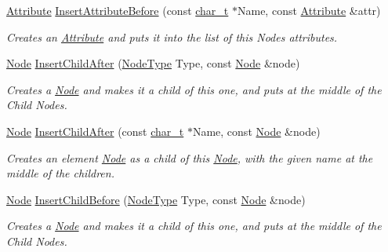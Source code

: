 \begin{DoxyCompactItemize}
\hyperlink{classMezzanine_1_1xml_1_1Attribute}{Attribute} \hyperlink{classMezzanine_1_1xml_1_1Node_a7614742c87922dd19f4a9ae2e393ebc3}{InsertAttributeBefore} (const \hyperlink{namespaceMezzanine_1_1xml_a29b8a47c179e9895c4e9e66c45d1dbbc}{char\_\-t} $\ast$Name, const \hyperlink{classMezzanine_1_1xml_1_1Attribute}{Attribute} \&attr)
\begin{DoxyCompactList}\small\item\em Creates an \hyperlink{classMezzanine_1_1xml_1_1Attribute}{Attribute} and puts it into the list of this Nodes attributes. \item\end{DoxyCompactList}\item 
\hyperlink{classMezzanine_1_1xml_1_1Node}{Node} \hyperlink{classMezzanine_1_1xml_1_1Node_a227829d650b184329245c5abdd0476df}{InsertChildAfter} (\hyperlink{namespaceMezzanine_1_1xml_a524d867e34ff408b8f45a51b7924cb80}{NodeType} Type, const \hyperlink{classMezzanine_1_1xml_1_1Node}{Node} \&node)
\begin{DoxyCompactList}\small\item\em Creates a \hyperlink{classMezzanine_1_1xml_1_1Node}{Node} and makes it a child of this one, and puts at the middle of the Child Nodes. \item\end{DoxyCompactList}\item 
\hyperlink{classMezzanine_1_1xml_1_1Node}{Node} \hyperlink{classMezzanine_1_1xml_1_1Node_a130d3fc4581355cbf7faf9ce56583113}{InsertChildAfter} (const \hyperlink{namespaceMezzanine_1_1xml_a29b8a47c179e9895c4e9e66c45d1dbbc}{char\_\-t} $\ast$Name, const \hyperlink{classMezzanine_1_1xml_1_1Node}{Node} \&node)
\begin{DoxyCompactList}\small\item\em Creates an element \hyperlink{classMezzanine_1_1xml_1_1Node}{Node} as a child of this \hyperlink{classMezzanine_1_1xml_1_1Node}{Node}, with the given name at the middle of the children. \item\end{DoxyCompactList}\item 
\hyperlink{classMezzanine_1_1xml_1_1Node}{Node} \hyperlink{classMezzanine_1_1xml_1_1Node_a0f877b7c3d64ede9a73662ed2fff0ef5}{InsertChildBefore} (\hyperlink{namespaceMezzanine_1_1xml_a524d867e34ff408b8f45a51b7924cb80}{NodeType} Type, const \hyperlink{classMezzanine_1_1xml_1_1Node}{Node} \&node)
\begin{DoxyCompactList}\small\item\em Creates a \hyperlink{classMezzanine_1_1xml_1_1Node}{Node} and makes it a child of this one, and puts at the middle of the Child Nodes. \item\end{DoxyCompactList}\item 

\end{DoxyCompactItemize}
